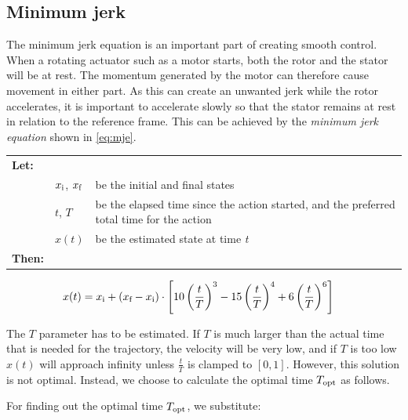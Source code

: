 \documentclass[11pt]{article}
\begin{document}
\subsection{Minimum jerk}
\label{sec:mje}
The minimum jerk equation is an important part of creating smooth control. When a rotating actuator such as a motor starts, both the rotor and the stator will be at rest. The momentum generated by the motor can therefore cause movement in either part. As this can create an unwanted jerk while the rotor accelerates, it is important to accelerate slowly so that the stator remains at rest in relation to the reference frame. This can be achieved by the \emph{minimum jerk equation} shown in \vref{eq:mje}.
\par \vspace{10pt}
{\footnotesize
  \begin{tabular}{l l l}
    \textbf{Let:} \\
 &$x_\textup{i}$, $x_\textup{f}$ &be the initial and final states\\
 &$t$, $T$ &be the elapsed time since the action started, and the preferred total time for the action  \\
 &$x(t)$ &be the estimated state at time \emph{t} \\
    \textbf{Then:}
  \end{tabular}
  \begin{align}
    x(t) &= x_\textup{i} +  (x_\textup{f} - x_\textup{i}) \cdot \left[10\left(\frac{t}{T}\right)^3 - 15\left(\frac{t}{T}\right)^4 + 6\left(\frac{t}{T}\right)^6 \right]\label{eq:mje}          
  \end{align}}%
\par
The $T$ parameter has to be estimated. If $T$ is much larger than  the actual time that is needed for the trajectory, the velocity will be very low, and if $T$ is too low $x(t)$ will approach infinity unless $\frac{t}{T}$ is clamped to $[0,1]$. However, this solution is not optimal. Instead, we choose to calculate the optimal time $T_\textup{opt}$ as follows. \par \vspace{2pt}
For finding out the optimal time $T_\textup{opt}$, we substitute:
\end{document}
